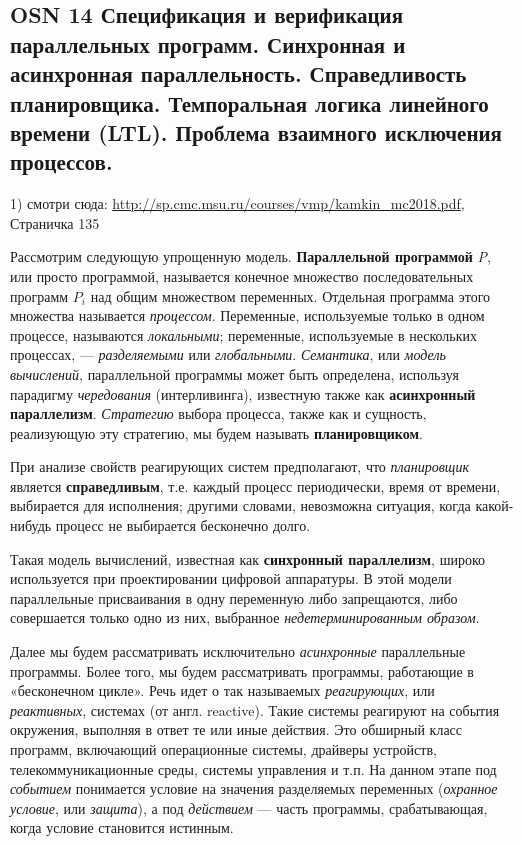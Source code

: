 \subsection{OSN 14 Спецификация и верификация параллельных программ. Синхронная и асинхронная параллельность. Справедливость планировщика. Темпоральная логика линейного времени (LTL). Проблема взаимного исключения процессов.}

\text{}
\newline
\indent

1) смотри сюда: \url{http://sp.cmc.msu.ru/courses/vmp/kamkin_mc2018.pdf}, 
Страничка 135

Рассмотрим следующую упрощенную модель.
\textbf{Параллельной программой} \textit{P}, или просто программой, называется конечное множество последовательных программ \textit{$P_i$} над общим множеством переменных. 
Отдельная программа этого множества называется \textit{процессом}.
Переменные, используемые только в одном процессе, называются \textit{локальными}; переменные, используемые в нескольких процессах, — \textit{разделяемыми} или \textit{глобальными}.
\textit{Семантика}, или \textit{модель вычислений}, параллельной программы может быть определена, используя парадигму \textit{чередования} (интерливинга), известную также как \textbf{асинхронный параллелизм}. 
\textit{Стратегию} выбора процесса, также как и сущность, реализующую эту стратегию, мы будем называть \textbf{планировщиком}. 

При анализе свойств реагирующих систем предполагают, что \textit{планировщик} является \textbf{справедливым}, т.е. каждый процесс периодически, время от времени, выбирается для исполнения; другими словами, невозможна ситуация, когда какой-нибудь процесс не выбирается бесконечно долго.

Такая модель вычислений, известная как \textbf{синхронный параллелизм}, широко используется при проектировании цифровой аппаратуры. 
В этой модели параллельные присваивания в одну переменную либо запрещаются, либо совершается только одно из них, выбранное \textit{недетерминированным образом}.

Далее мы будем рассматривать исключительно \textit{асинхронные} параллельные программы. 
Более того, мы будем рассматривать программы, работающие в «бесконечном цикле». 
Речь идет о так называемых \textit{реагирующих}, или \textit{реактивных}, системах (от англ. reactive). 
Такие системы реагируют на события окружения, выполняя в ответ те или иные действия. 
Это обширный класс программ, включающий операционные системы, драйверы устройств, телекоммуникационные среды, системы управления и т.п.
На данном этапе под \textit{событием} понимается условие на значения разделяемых переменных (\textit{охранное условие}, или \textit{защита}), а под \textit{действием} — часть программы, срабатывающая, когда условие становится истинным. 


